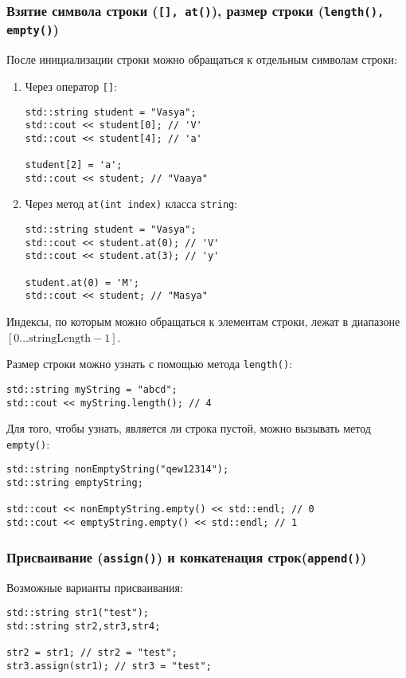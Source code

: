 \subsubsection{Взятие символа строки (\texttt{[], at()}), размер строки (\texttt{length(), empty()})}
После инициализации строки можно обращаться к отдельным символам строки:
\begin{enumerate}
    \item Через оператор \lstinline|[]|:
    \begin{lstlisting}
std::string student = "Vasya";
std::cout << student[0]; // 'V'
std::cout << student[4]; // 'a'

student[2] = 'a';
std::cout << student; // "Vaaya"
    \end{lstlisting}
    \item Через метод \lstinline|at(int index)| класса \lstinline|string|:
    \begin{lstlisting}
std::string student = "Vasya";
std::cout << student.at(0); // 'V'
std::cout << student.at(3); // 'y'

student.at(0) = 'M';
std::cout << student; // "Masya"
    \end{lstlisting}
\end{enumerate}

Индексы, по которым можно обращаться к элементам строки,
лежат в диапазоне~$\left[ 0 \ldots \text{stringLength} - 1 \right]$.

Размер строки можно узнать с помощью метода \lstinline|length()|:
\begin{lstlisting}
std::string myString = "abcd";
std::cout << myString.length(); // 4
\end{lstlisting}

Для того, чтобы узнать, является ли строка пустой, можно вызывать метод \lstinline|empty()|:
\begin{lstlisting}
std::string nonEmptyString("qew12314");
std::string emptyString;

std::cout << nonEmptyString.empty() << std::endl; // 0
std::cout << emptyString.empty() << std::endl; // 1
\end{lstlisting}

\subsubsection{Присваивание (\texttt{assign()}) и конкатенация строк(\texttt{append()})}

Возможные варианты присваивания:
\begin{lstlisting}
std::string str1("test");
std::string str2,str3,str4;

str2 = str1; // str2 = "test";
str3.assign(str1); // str3 = "test";
\end{lstlisting}


